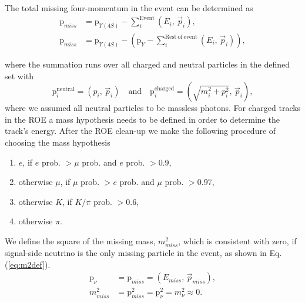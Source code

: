 The total missing four-momentum in the event can be determined as
\begin{align}
\mathrm{p}_{miss} &= \mathrm{p}_{\Upsilon(4S)} - \sum_i^{\mathrm{Event}}\left(E_i,\,\vec{p}_i \right),\\
\label{eq:ROEloop}
\mathrm{p}_{miss} &= \mathrm{p}_{\Upsilon(4S)} - \left(\mathrm{p}_{Y} -\sum_i^{\mathrm{Rest~of~event}}\left(E_i,\,\vec{p}_i \right)\right),
\end{align}

where the summation runs over all charged and neutral particles in the defined set with
\begin{equation}
\mathrm{p}^{\mathrm{neutral}}_i = \left(p_i,\, \vec{p}_i \right) \quad \mathrm{and} \quad \mathrm{p}^{\mathrm{charged}}_i = \left(\sqrt{m_i^2 + p_i^2},\, \vec{p}_i \right),
\label{eq:pcharged}
\end{equation}
where we assumed all neutral particles to be massless photons. For charged tracks in the ROE a mass hypothesis needs to be defined in order to determine the track's energy. After the ROE clean-up we make the following procedure of choosing the mass hypothesis
\begin{enumerate}
	\item $e$, if $e$ prob. $> \mu$ prob. and $e$ prob. $> 0.9$,
	\item otherwise $\mu$, if $\mu$ prob. $> e$ prob. and $\mu$ prob. $> 0.97$,
	\item otherwise $K$, if $K/\pi$ prob. $> 0.6$,
	\item otherwise $\pi$.
\end{enumerate} 
We define the square of the missing mass, $m_{miss}^2$, which is consistent with zero, if signal-side neutrino is the only missing particle in the event, as shown in Eq. (\ref{eq:m2def}).
\begin{align}
\label{eq:nuold}
\mathrm{p}_\nu &= \mathrm{p}_{miss} = \left(E_{miss},\,\vec{p}_{miss} \right),\\
\label{eq:m2def}
m_{miss}^2 &= \mathrm{p}_{miss}^2 = \mathrm{p}_{\nu}^2 = m_\nu^2 \approx 0.
\end{align}

